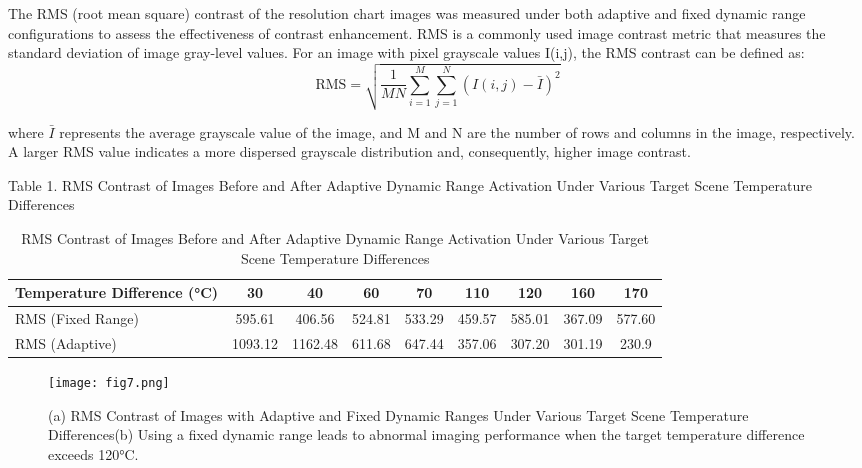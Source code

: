 \documentclass[a4paper,fleqn]{cas-dc}
\begin{document}
The RMS (root mean square) contrast of the resolution chart images was measured under both adaptive and fixed dynamic range configurations to assess the effectiveness of contrast enhancement. RMS is a commonly used image contrast metric that measures the standard deviation of image gray-level values\citep{ionescu_study_2014}. For an image with pixel grayscale values I(i,j), the RMS contrast can be defined as:
\begin{equation}
\text{RMS} = \sqrt{ \frac{1}{MN} \sum_{i=1}^{M} \sum_{j=1}^{N} \left( I(i,j) - \bar{I} \right)^2 }
\end{equation}

where $\bar{I}$ represents the average grayscale value of the image, and M and N are the number of rows and columns in the image, respectively. A larger RMS value indicates a more dispersed grayscale distribution and, consequently, higher image contrast.

Table 1. RMS Contrast of Images Before and After Adaptive Dynamic Range Activation Under Various Target Scene Temperature Differences

\begin{table*}[t]
  \centering
  \caption{RMS Contrast of Images Before and After Adaptive Dynamic Range Activation Under Various Target Scene Temperature Differences}
  \label{table1}
  \small            %
  \setlength{\tabcolsep}{4pt}  %
  \begin{tabular*}{0.8\linewidth}{@{\extracolsep{\fill}}lcccccccc@{}}
\hline
Temperature Difference (°C) & 30      & 40      & 60     & 70     & 110    & 120    & 160    & 170    \\ \hline
RMS (Fixed Range)           & 595.61  & 406.56  & 524.81 & 533.29 & 459.57 & 585.01 & 367.09 & 577.60 \\
RMS (Adaptive)              & 1093.12 & 1162.48 & 611.68 & 647.44 & 357.06 & 307.20 & 301.19 & 230.9  \\ \hline
  \end{tabular*}
\end{table*}


\begin{figure*}[ht]
    \centering
    \texttt{[image: fig7.png]}
    \caption{(a) RMS Contrast of Images with Adaptive and Fixed Dynamic Ranges Under Various Target Scene Temperature Differences(b) Using a fixed dynamic range leads to abnormal imaging performance when the target temperature difference exceeds 120°C.}
    \label{fig:fig7}
\end{figure*}
\end{document}
